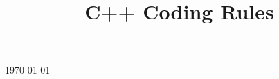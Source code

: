 \documentclass[12pt,twoside,openright,a4paper]{llncs}
\title{C++ Coding Rules}
\author{}
\institute{}
\begin{document}
\maketitle
\begin{center}
  \today
\end{center}

%

\cleardoublepage
\setcounter{tocdepth}{3}
\tableofcontents
\cleardoublepage















\cite{*}
\end{document}
